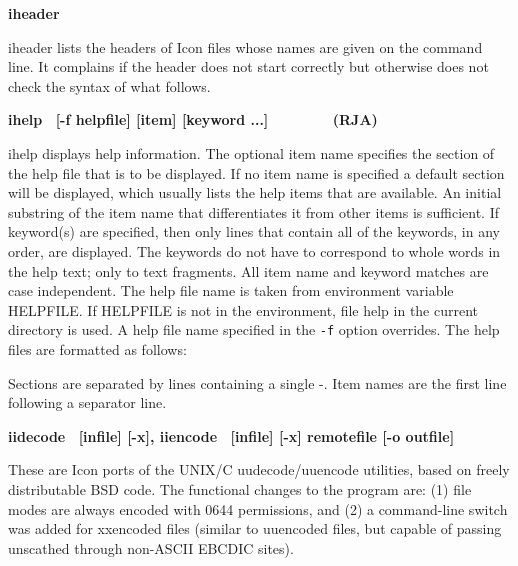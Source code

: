 {{\sffamily\bfseries
iheader\ \ \ \ \ \ \ \ \ \ \ \ \ \ \ \ \ \ \ \ }

\textsf{iheader} lists the headers of Icon files whose names are given
on the command line. It complains if the header does not start
correctly but otherwise does not check the syntax of what follows. 

{\sffamily\bfseries
ihelp \ \textrm{\textmd{[-f helpfile] [item] [keyword
...]\ \ \ \ \ \ \ \ }}(RJA)}

\textsf{ihelp} displays help information. The optional item name
specifies the section of the help file that is to be displayed. If no
item name is specified a default section will be displayed, which
usually lists the help items that are available. An initial substring
of the item name that differentiates it from other items is sufficient.
If keyword(s) are specified, then only lines that contain all of the
keywords, in any order, are displayed. The keywords do not have to
correspond to whole words in the help text; only to text fragments. All
item name and keyword matches are case independent. The help file name
is taken from environment variable
HELPFILE. If HELPFILE is not in the environment, file
{\textquotedbl}help{\textquotedbl} in the current directory is used. A
help file name specified in the \texttt{{}-f} option overrides. The
help files are formatted as follows:


Sections are separated by lines containing a single
{\textquotedbl}-{\textquotedbl}. Item names are the first line
following a separator line.

{\sffamily\bfseries
iidecode \ \textrm{\textmd{[infile] [-x]}}, iiencode
\ \textrm{\textmd{[infile] [-x] remotefile [-o outfile]}}}

These are Icon ports of the UNIX/C uudecode/uuencode utilities, based on freely distributable BSD code.
The functional changes to the program are: (1) file modes are always
encoded with 0644 permissions, and (2) a command-line switch was added
for xxencoded files (similar to uuencoded files, but capable of passing
unscathed through non-ASCII EBCDIC sites).

}
